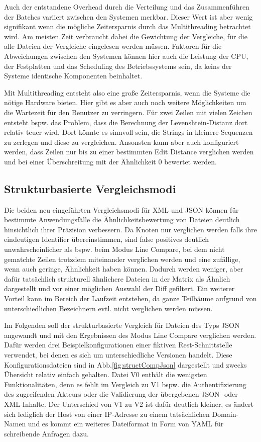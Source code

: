 Auch der entstandene Overhead durch die Verteilung und das Zusammenführen der Batches variiert zwischen den Systemen merkbar. Dieser Wert ist aber wenig signifikant wenn die mögliche Zeitersparnis durch das Multithreading betrachtet wird. Am meisten Zeit verbraucht dabei die Gewichtung der Vergleiche, für die alle Dateien der Vergleiche eingelesen werden müssen. Faktoren für die Abweichungen zwischen den Systemen können hier auch die Leistung der CPU, der Festplatten und das Scheduling des Betriebssystems sein, da keins der Systeme identische Komponenten beinhaltet. 

Mit Multithreading entsteht also eine große Zeitersparnis, wenn die Systeme die nötige Hardware bieten. Hier gibt es aber auch noch weitere Möglichkeiten um die Wartezeit für den Benutzer zu verringern. Für zwei Zeilen mit vielen Zeichen entsteht bspw. das Problem, dass die Berechnung der Levenshtein-Distanz dort relativ teuer wird. Dort könnte es sinnvoll sein, die Strings in kleinere Sequenzen zu zerlegen und diese zu vergleichen. Ansonsten kann aber auch konfiguriert werden, dass Zeilen nur bis zu einer bestimmten Edit Distance verglichen werden und bei einer Überschreitung mit der Ähnlichkeit 0 bewertet werden. 

\subsection{Strukturbasierte Vergleichsmodi}

Die beiden neu eingeführten Vergleichsmodi für XML und JSON können für bestimmte Anwendungsfälle die Ähnlichkeitsbewertung von Dateien deutlich hinsichtlich ihrer Präzision verbessern. Da Knoten nur verglichen werden falls ihre eindeutigen Identifier übereinstimmen, sind false positives deutlich unwahrscheinlicher als bspw. beim Modus Line Compare, bei dem nicht gematchte Zeilen trotzdem miteinander verglichen werden und eine zufällige, wenn auch geringe, Ähnlichkeit haben können. Dadurch werden weniger, aber dafür tatsächlich strukturell ähnlichere Dateien in der Matrix als Ähnlich dargestellt und vor einer möglichen Auswahl der Diff gefiltert. Ein weiterer Vorteil kann im Bereich der Laufzeit entstehen, da ganze Teilbäume aufgrund von unterschiedlichen Bezeichnern evtl. nicht verglichen werden müssen. 

Im Folgenden soll der strukturbasierte Vergleich für Dateien des Typs JSON angewandt und mit den Ergebnissen des Modus Line Compare verglichen werden. Dafür werden drei Beispielkonfigurationen einer fiktiven Rest-Schnittstelle verwendet, bei denen es sich um unterschiedliche Versionen handelt. Diese Konfigurationsdateien sind in Abb.\ref{fig:structCompJson} dargestellt und zwecks Übersicht relativ einfach gehalten. Datei V0 enthält die wenigsten Funktionalitäten, denn es fehlt im Vergleich zu V1 bspw. die Authentifizierung des zugreifenden Akteurs oder die Validierung der übergebenen JSON- oder XML-Inhalte. Der Unterschied von V1 zu V2 ist dafür deutlich kleiner, es ändert sich lediglich der Host von einer IP-Adresse zu einem tatsächlichen Domain-Namen und es kommt ein weiteres Dateiformat in Form von YAML für schreibende Anfragen dazu. 

